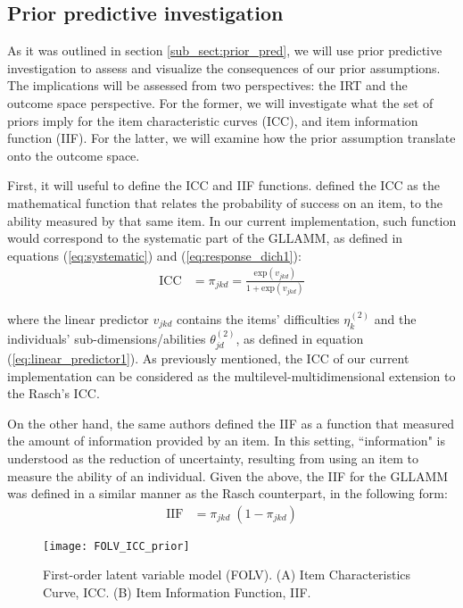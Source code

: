 
\subsection{Prior predictive investigation} \label{sub_sect:prior_pred_inv}

As it was outlined in section \ref{sub_sect:prior_pred}, we will use prior predictive investigation to assess and visualize the consequences of our prior assumptions. The implications will be assessed from two perspectives: the IRT and the outcome space perspective. For the former, we will investigate what the set of priors imply for the item characteristic curves (ICC), and item information function (IIF). For the latter, we will examine how the prior assumption translate onto the outcome space.

First, it will useful to define the ICC and IIF functions. \citet{Hambleton_et_al_1991b} defined the ICC as the mathematical function that relates the probability of success on an item, to the ability measured by that same item. In our current implementation, such function would correspond to the systematic part of the GLLAMM, as defined in equations (\ref{eq:systematic}) and (\ref{eq:response_dich1}):
%
\begin{equation} \label{eq:ICC}
	\begin{split}
		\text{ICC} &= \pi_{jkd} = \frac{ \text{exp}(v_{jkd}) }{ 1 + \text{exp}(v_{jkd}) }
	\end{split}	
\end{equation}

\noindent where the linear predictor $v_{jkd}$ contains the items' difficulties $\eta^{(2)}_{k}$ and the individuals' sub-dimensions/abilities $\theta^{(2)}_{jd}$, as defined in equation (\ref{eq:linear_predictor1}). As previously mentioned, the ICC of our current implementation can be considered as the multilevel-multidimensional extension to the Rasch's ICC.

On the other hand, the same authors defined the IIF as a function that measured the amount of information provided by an item. In this setting, ``information" is understood as the reduction of uncertainty, resulting from using an item to measure the ability of an individual. Given the above, the IIF for the GLLAMM was defined in a similar manner as the Rasch counterpart, in the following form:
%
\begin{equation} \label{eq:IIF}
	\begin{split}
		\text{IIF} &= \pi_{jkd} \; (1 - \pi_{jkd})
	\end{split}	
\end{equation}
%
\begin{figure}[H]
	\centering
	\texttt{[image: FOLV\_ICC\_prior]}
	\caption[First-order latent variable model (FOLV). Item Characteristic Curve (ICC) and Item Information Function (IIF).]%
	{First-order latent variable model (FOLV). (A) Item Characteristics Curve, ICC. (B) Item Information Function, IIF.}
	\label{fig:FOLV_ICC_prior}
\end{figure}

